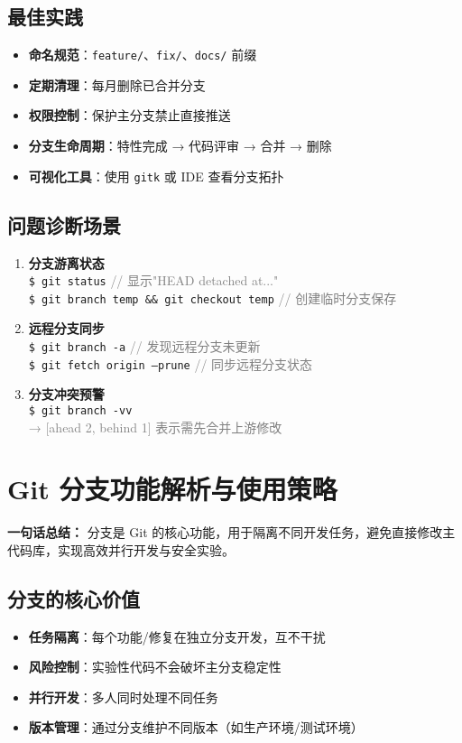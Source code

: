 \subsection{最佳实践}
\begin{itemize}[leftmargin=*, nosep]
    \item \textbf{命名规范}：\texttt{feature/}、\texttt{fix/}、\texttt{docs/} 前缀
    \item \textbf{定期清理}：每月删除已合并分支
    \item \textbf{权限控制}：保护主分支禁止直接推送
    \item \textbf{分支生命周期}：特性完成 → 代码评审 → 合并 → 删除
    \item \textbf{可视化工具}：使用 \texttt{gitk} 或 IDE 查看分支拓扑
\end{itemize}

\subsection{问题诊断场景}
\begin{enumerate}[leftmargin=*, nosep]
    \item \textbf{分支游离状态} \\
    \texttt{\$ git status} \quad \textcolor{gray}{// 显示"HEAD detached at..."} \\
    \texttt{\$ git branch temp \&\& git checkout temp} \quad \textcolor{gray}{// 创建临时分支保存}
    
    \item \textbf{远程分支同步} \\
    \texttt{\$ git branch -a} \quad \textcolor{gray}{// 发现远程分支未更新} \\
    \texttt{\$ git fetch origin --prune} \quad \textcolor{gray}{// 同步远程分支状态}
    
    \item \textbf{分支冲突预警} \\
    \texttt{\$ git branch -vv} \\
    \textcolor{gray}{→ [ahead 2, behind 1] 表示需先合并上游修改}
\end{enumerate}


\section{Git 分支功能解析与使用策略}
\textbf{一句话总结：}  
分支是 Git 的核心功能，用于隔离不同开发任务，避免直接修改主代码库，实现高效并行开发与安全实验。

\subsection{分支的核心价值}
\begin{itemize}[leftmargin=*, nosep]
    \item \textbf{任务隔离}：每个功能/修复在独立分支开发，互不干扰
    \item \textbf{风险控制}：实验性代码不会破坏主分支稳定性
    \item \textbf{并行开发}：多人同时处理不同任务
    \item \textbf{版本管理}：通过分支维护不同版本（如生产环境/测试环境）
\end{itemize}

